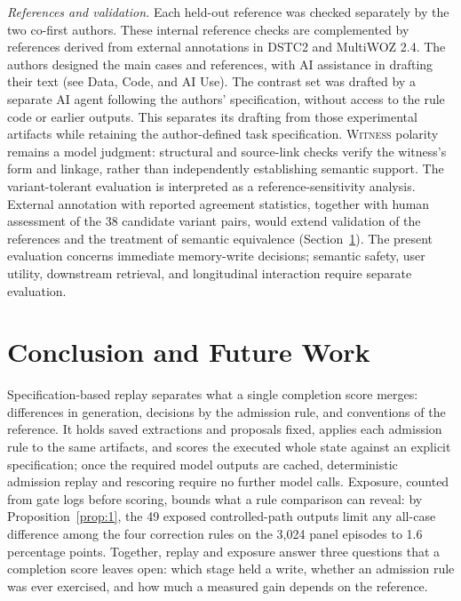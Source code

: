 \documentclass[acmsmall,review]{acmart}
\newcommand{\witness}{\textsc{Witness}}
\begin{document}
\emph{References and validation.} Each held-out reference was checked separately by the two co-first authors. These internal reference checks are complemented by references derived from external annotations in DSTC2 and MultiWOZ 2.4. The authors designed the main cases and references, with AI assistance in drafting their text (see Data, Code, and AI Use). The contrast set was drafted by a separate AI agent following the authors' specification, without access to the rule code or earlier outputs. This separates its drafting from those experimental artifacts while retaining the author-defined task specification. \witness{} polarity remains a model judgment: structural and source-link checks verify the witness's form and linkage, rather than independently establishing semantic support. The variant-tolerant evaluation is interpreted as a reference-sensitivity analysis. External annotation with reported agreement statistics, together with human assessment of the 38 candidate variant pairs, would extend validation of the references and the treatment of semantic equivalence (Section~\ref{sec:future work and conclusion}). The present evaluation concerns immediate memory-write decisions; semantic safety, user utility, downstream retrieval, and longitudinal interaction require separate evaluation.

\section{Conclusion and Future Work}\label{sec:future work and conclusion}
Specification-based replay separates what a single completion score merges: differences in generation, decisions by the admission rule, and conventions of the reference. It holds saved extractions and proposals fixed, applies each admission rule to the same artifacts, and scores the executed whole state against an explicit specification; once the required model outputs are cached, deterministic admission replay and rescoring require no further model calls. Exposure, counted from gate logs before scoring, bounds what a rule comparison can reveal: by Proposition~\ref{prop:1}, the 49 exposed controlled-path outputs limit any all-case difference among the four correction rules on the 3,024 panel episodes to 1.6 percentage points. Together, replay and exposure answer three questions that a completion score leaves open: which stage held a write, whether an admission rule was ever exercised, and how much a measured gain depends on the reference.
\end{document}
